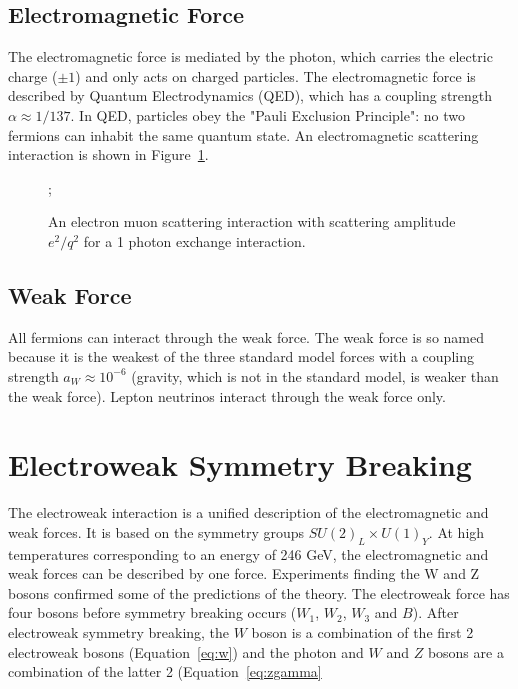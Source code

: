 \subsection*{Electromagnetic Force}

The electromagnetic force is mediated by the photon, which carries the electric charge ($\pm 1$) and only acts on charged particles. The electromagnetic force is described by Quantum Electrodynamics (QED), which has a coupling strength $\alpha \approx 1/137$. In QED, particles obey the "Pauli Exclusion Principle": no two fermions can inhabit the same quantum state. An electromagnetic scattering interaction is shown in Figure~\ref{fig:feynman_ee}.

\begin{figure}[h]
	\centering
	;
	\caption{An electron muon scattering interaction with scattering amplitude $e^2/q^2$ for a 1 photon exchange interaction.}
	\label{fig:feynman_ee}
\end{figure}



\subsection*{Weak Force}

All fermions can interact through the weak force. The weak force is so named because it is the weakest of the three standard model forces with a coupling strength $a_W \approx 10^{-6}$ (gravity, which is not in the standard model, is weaker than the weak force). Lepton neutrinos interact through the weak force only.




\section{Electroweak Symmetry Breaking}

The electroweak interaction is a unified description of the electromagnetic and weak forces. It is based on the symmetry groups $SU(2)_L \times U(1)_Y$. At high temperatures corresponding to an energy of 246 GeV, the electromagnetic and weak forces can be described by one force. Experiments finding the W and Z bosons confirmed some of the predictions of the theory. The electroweak force has four bosons before symmetry breaking occurs ($W_1$, $W_2$, $W_3$ and $B$). After electroweak symmetry breaking, the $W$ boson is a combination of the first 2 electroweak bosons (Equation~\ref{eq:w}) and the photon and $W$ and $Z$ bosons are a combination of the latter 2 (Equation~\ref{eq:zgamma}


